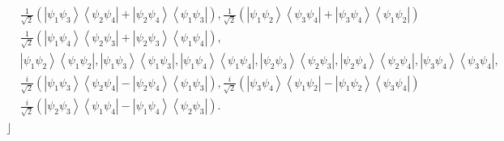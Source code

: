 \documentclass[aps,preprint]{revtex4}%
\begin{document}
\begin{align}
&  \frac{1}{\sqrt{2}}\left(  \left\vert \psi_{1}\psi_{3}\right\rangle
\left\langle \psi_{2}\psi_{4}\right\vert +\left\vert \psi_{2}\psi
_{4}\right\rangle \left\langle \psi_{1}\psi_{3}\right\vert \right)  ,\frac
{1}{\sqrt{2}}\left(  \left\vert \psi_{1}\psi_{2}\right\rangle \left\langle
\psi_{3}\psi_{4}\right\vert +\left\vert \psi_{3}\psi_{4}\right\rangle
\left\langle \psi_{1}\psi_{2}\right\vert \right) \nonumber\\
&  \frac{1}{\sqrt{2}}\left(  \left\vert \psi_{1}\psi_{4}\right\rangle
\left\langle \psi_{2}\psi_{3}\right\vert +\left\vert \psi_{2}\psi
_{3}\right\rangle \left\langle \psi_{1}\psi_{4}\right\vert \right)
,\nonumber\\
&  \left\vert \psi_{1}\psi_{2}\right\rangle \left\langle \psi_{1}\psi
_{2}\right\vert ,\left\vert \psi_{1}\psi_{3}\right\rangle \left\langle
\psi_{1}\psi_{3}\right\vert ,\left\vert \psi_{1}\psi_{4}\right\rangle
\left\langle \psi_{1}\psi_{4}\right\vert ,\left\vert \psi_{2}\psi
_{3}\right\rangle \left\langle \psi_{2}\psi_{3}\right\vert ,\left\vert
\psi_{2}\psi_{4}\right\rangle \left\langle \psi_{2}\psi_{4}\right\vert
,\left\vert \psi_{3}\psi_{4}\right\rangle \left\langle \psi_{3}\psi
_{4}\right\vert ,\nonumber\\
&  \frac{i}{\sqrt{2}}\left(  \left\vert \psi_{1}\psi_{3}\right\rangle
\left\langle \psi_{2}\psi_{4}\right\vert -\left\vert \psi_{2}\psi
_{4}\right\rangle \left\langle \psi_{1}\psi_{3}\right\vert \right)  ,\frac
{i}{\sqrt{2}}\left(  \left\vert \psi_{3}\psi_{4}\right\rangle \left\langle
\psi_{1}\psi_{2}\right\vert -\left\vert \psi_{1}\psi_{2}\right\rangle
\left\langle \psi_{3}\psi_{4}\right\vert \right) \nonumber\\
&  \frac{i}{\sqrt{2}}\left(  \left\vert \psi_{2}\psi_{3}\right\rangle
\left\langle \psi_{1}\psi_{4}\right\vert -\left\vert \psi_{1}\psi
_{4}\right\rangle \left\langle \psi_{2}\psi_{3}\right\vert \right)  .
\end{align}
$\rfloor$
\end{document}

